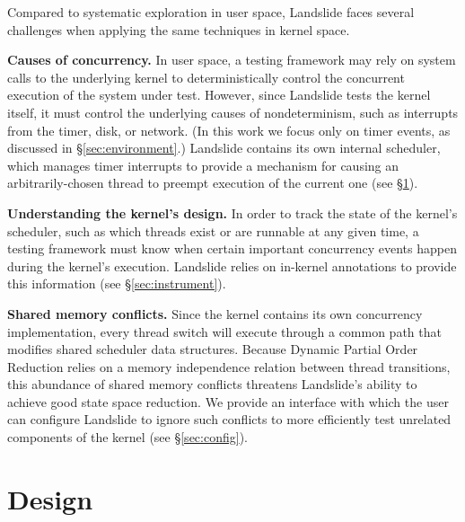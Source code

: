 \documentclass{llncs}
\begin{document}
Compared to systematic exploration in user space, Landslide faces several challenges when applying the same techniques in kernel space.

{\bf Causes of concurrency.} In user space, a testing framework may rely on system calls to the underlying kernel to deterministically control the concurrent execution of the system under test.
However, since Landslide tests the kernel itself, it must control the underlying causes of nondeterminism, such as interrupts from the timer, disk, or network. (In this work we focus only on timer events, as discussed in \S\ref{sec:environment}.)
Landslide contains its own internal scheduler, which manages timer interrupts to provide a mechanism for causing an arbitrarily-chosen thread to preempt execution of the current one (see \S\ref{sec:design}).

{\bf Understanding the kernel's design.} In order to track the state of the kernel's scheduler, such as which threads exist or are runnable at any given time, a testing framework must know when certain important concurrency events happen during the kernel's execution.
Landslide relies on in-kernel annotations to provide this information (see \S\ref{sec:instrument}).

{\bf Shared memory conflicts.} Since the kernel contains its own concurrency implementation, every thread switch will execute through a common path that modifies shared scheduler data structures.
Because Dynamic Partial Order Reduction relies on a memory independence relation between thread transitions, this abundance of shared memory conflicts threatens Landslide's ability to achieve good state space reduction.
We provide an interface with which the user can configure Landslide to ignore such conflicts to more efficiently test unrelated components of the kernel (see \S\ref{sec:config}).


\section{Design}
\label{sec:design}

\end{document}
